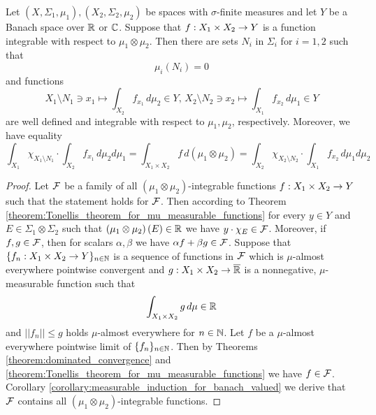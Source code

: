 \begin{theorem}\label{corollary:fubiniforintegrable}
Let $(X,\Sigma_1,\mu_1), (X_2,\Sigma_2,\mu_2)$ be spaces with $\sigma$-finite measures and let $Y$ be a Banach space over ${\mathbb R}$ or ${\mathbb C}$. Suppose that $f:X_1\times X_2\rightarrow Y$ is a function integrable with respect to $\mu_1\otimes \mu_2$. Then there are sets $N_i$ in $\Sigma_i$ for $i=1,2$ such that
$$\mu_i(N_i) = 0$$ 
and functions
$$X_1\setminus N_1\ni x_1\mapsto \int_{X_2}f_{x_1}\,d\mu_2\in Y,\,X_2\setminus N_2\ni x_2\mapsto \int_{X_1}f_{x_2}\,d\mu_1\in Y$$
are well defined and integrable with respect to $\mu_1, \mu_2$, respectively. Moreover, we have equality
$$\int_{X_1}\chi_{X_1\setminus N_1}\cdot \int_{X_2} f_{x_1}\,d\mu_2d\mu_1 = \int_{X_1\times X_2}f\,d(\mu_1\otimes \mu_2) = \int_{X_2}\chi_{X_2\setminus N_2}\cdot\int_{X_1} f_{x_2}\,d\mu_1d\mu_2$$
\end{theorem}
\begin{proof}
Let ${\mathcal F}$ be a family of all $\left(\mu_1\otimes \mu_2\right)$-integrable functions $f:X_1\times X_2\rightarrow Y$ such that the statement holds for ${\mathcal F}$. Then according to Theorem \ref{theorem:Tonellis_theorem_for_mu_measurable_functions} for every $y\in Y$ and $E\in \Sigma_1\otimes \Sigma_2$ such that $\left(\mu_1\otimes \mu_2\right)(E) \in {\mathbb R}$ we have $y\cdot \chi_E \in {\mathcal F}$. Moreover, if $f, g\in {\mathcal F}$, then for scalars $\alpha,\beta$ we have $\alpha f + \beta g\in {\mathcal F}$. Suppose that $\{f_n:X_1\times X_2\rightarrow Y\}_{n\in {\mathbb N}}$ is a sequence of functions in ${\mathcal F}$ which is $\mu$-almost everywhere pointwise convergent and $g:X_1\times X_2\rightarrow \overline{{\mathbb R}}$ is a nonnegative, $\mu$-measurable function such that
$$\int_{X_1\times X_2}g\,d\mu \in {\mathbb R}$$
and $||f_n||\leq g$ holds $\mu$-almost everywhere for $n\in {\mathbb N}$. Let $f$ be a $\mu$-almost everywhere pointwise limit of $\{f_n\}_{n\in {\mathbb N}}$. Then by Theorems \ref{theorem:dominated_convergence} and \ref{theorem:Tonellis_theorem_for_mu_measurable_functions} we have $f\in {\mathcal F}$. Corollary \ref{corollary:measurable_induction_for_banach_valued} we derive that ${\mathcal F}$ contains all $\left(\mu_1\otimes \mu_2\right)$-integrable functions.
\end{proof}




\small



